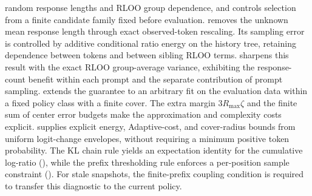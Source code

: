random response lengths and RLOO group dependence, and controls selection
from a finite candidate family fixed before evaluation.
 removes the unknown mean response
length through exact observed-token rescaling. Its sampling error is
controlled by additive conditional ratio energy on the history tree,
retaining dependence between tokens and between sibling RLOO terms.
 sharpens this result with the exact RLOO
group-average variance, exhibiting the response-count benefit within each
prompt and the separate contribution of prompt sampling.
 extends the guarantee to an arbitrary
fit on the evaluation data within a fixed policy class with a finite cover.
The extra margin $3R_{\max}\zeta$ and the finite sum of center error budgets
make the approximation and complexity costs explicit.
 supplies explicit energy, Adaptive-cost,
and cover-radius bounds from uniform logit-change envelopes, without
requiring a minimum positive token probability.
The KL chain rule yields an
expectation identity for the cumulative log-ratio (), while the prefix thresholding rule enforces a per-position
sample constraint (). For stale snapshots, the
finite-prefix coupling condition is required to transfer this diagnostic to
the current policy.


